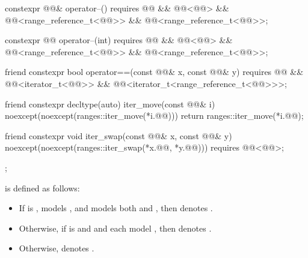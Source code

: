 \begin{codeblock}
{{    constexpr @@& operator--()
      requires @@ && @@<@@> &&
               @@<range_reference_t<@@>> &&
               @@<range_reference_t<@@>>;

    constexpr @@ operator--(int)
      requires @@ && @@<@@> &&
               @@<range_reference_t<@@>> &&
               @@<range_reference_t<@@>>;

    friend constexpr bool operator==(const @@& x, const @@& y)
      requires @@ && @@<iterator_t<@@>> &&
               @@<iterator_t<range_reference_t<@@>>>;

    friend constexpr decltype(auto) iter_move(const @@& i)
    noexcept(noexcept(ranges::iter_move(*i.@@))) {
      return ranges::iter_move(*i.@@);
    }

    friend constexpr void iter_swap(const @@& x, const @@& y)
      noexcept(noexcept(ranges::iter_swap(*x.@@, *y.@@)))
      requires @@<@@>;
  };
}
\end{codeblock}

\pnum
{} is defined as follows:
\begin{itemize}
\item If  is ,
   models , and
   models
  both  and ,
  then  denotes .
\item Otherwise, if  is  and
   and 
  each model , then  denotes
  .
\item Otherwise,  denotes .
\end{itemize}


